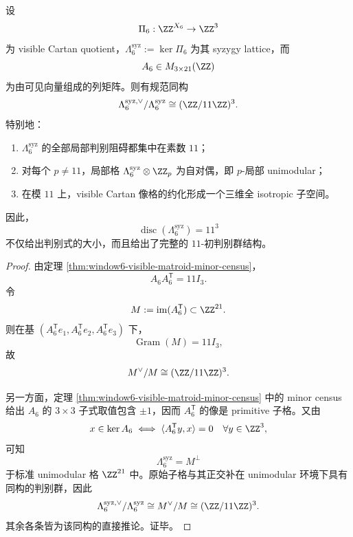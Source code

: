 \begin{theorem}\label{thm:conclusion-window6-syzygy-lattice-eleven-primary-discriminant-group}
设
\[
\Pi_6:\ZZ^{X_6}\to \ZZ^3
\]
为 visible Cartan quotient，\(\Lambda_6^{\mathrm{syz}}:=\ker \Pi_6\) 为其 syzygy lattice，而
\[
A_6\in M_{3\times 21}(\ZZ)
\]
为由可见向量组成的列矩阵。则有规范同构
\[
\Lambda_6^{\mathrm{syz},\vee}/\Lambda_6^{\mathrm{syz}}
\cong
(\ZZ/11\ZZ)^3.
\]
特别地：
\begin{enumerate}
  \item \(\Lambda_6^{\mathrm{syz}}\) 的全部局部判别阻碍都集中在素数 \(11\)；
  \item 对每个 \(p\neq 11\)，局部格 \(\Lambda_6^{\mathrm{syz}}\otimes \ZZ_p\) 为自对偶，即 \(p\)-局部 unimodular；
  \item 在模 \(11\) 上，visible Cartan 像格的约化形成一个三维全 isotropic 子空间。
\end{enumerate}
因此，
\[
\operatorname{disc}(\Lambda_6^{\mathrm{syz}})=11^3
\]
不仅给出判别式的大小，而且给出了完整的 \(11\)-初判别群结构。
\end{theorem}
\begin{proof}
由定理 \ref{thm:window6-visible-matroid-minor-census}，
\[
A_6A_6^{\mathsf T}=11I_3.
\]
令
\[
M:=\operatorname{im}(A_6^{\mathsf T})\subset \ZZ^{21}.
\]
则在基 \((A_6^{\mathsf T}e_1,A_6^{\mathsf T}e_2,A_6^{\mathsf T}e_3)\) 下，
\[
\operatorname{Gram}(M)=11I_3,
\]
故
\[
M^\vee/M\cong (\ZZ/11\ZZ)^3.
\]

另一方面，定理 \ref{thm:window6-visible-matroid-minor-census} 中的 minor census 给出 \(A_6\) 的 \(3\times 3\) 子式取值包含 \(\pm 1\)，因而 \(A_6^{\mathsf T}\) 的像是 primitive 子格。又由
\[
x\in \ker A_6
\iff
\langle A_6^{\mathsf T}y,x\rangle=0\quad \forall y\in \ZZ^3,
\]
可知
\[
\Lambda_6^{\mathrm{syz}}=M^\perp
\]
于标准 unimodular 格 \(\ZZ^{21}\) 中。原始子格与其正交补在 unimodular 环境下具有同构的判别群，因此
\[
\Lambda_6^{\mathrm{syz},\vee}/\Lambda_6^{\mathrm{syz}}
\cong
M^\vee/M
\cong
(\ZZ/11\ZZ)^3.
\]
其余各条皆为该同构的直接推论。证毕。
\end{proof}

